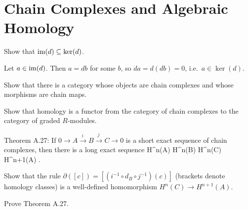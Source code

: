 \section{Chain Complexes and Algebraic Homology}

\bp
Show that $\operatorname{im}(d) \subseteq \ker(d)$.
\ep

\bs
Let $a\in \operatorname{im}(d)$. Then $a=db$ for some $b$, so $da=d(db)=0$, i.e.\ $a\in \ker(d)$.
\es

\bp
\ben[label=(\alph*)]
\item Show that there is a category whose objects are chain complexes and whose morphisms are chain maps.
\item Show that homology is a functor from the category of chain complexes to the category of graded $R$-modules.
\een
\ep

\bs
\ben[label=(\alph*)]
\item 
\item 
\een
\es

\addtocounter{exercise}{1}

\bp
Theorem A.27: If $0 \to A \xrightarrow{ i\ }B\xrightarrow{ j\ } C \to 0$ is a short exact sequence of chain complexes, then there is a long exact sequence
\bse
\cdots \to H^n(A)  H^n(B)   H^n(C)  \xrightarrow{ \ \partial\ } H^{n+1}(A) \to \cdots .
\ese
\ben[label=(\alph*)]
\item Show that the rule $\partial([c]) = [(i^{-1}\circ d_B\circ j^{-1})(c)]$ (brackets denote homology classes) is a well-defined homomorphism $H^n(C) \to H^{n+1}(A)$.
\item Prove Theorem A.27.
\een
\ep

\bs
\ben[label=(\alph*)]
\item 
\item 
\een
\es




















